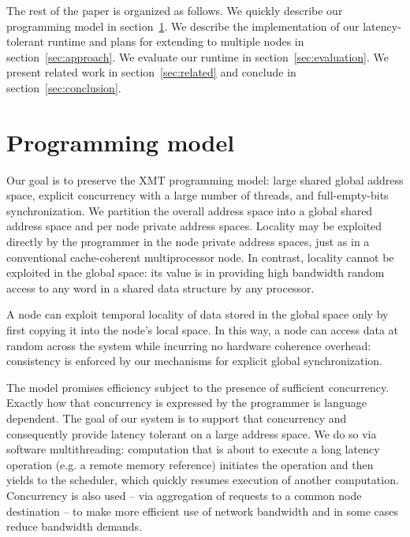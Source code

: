 \documentclass[10pt,nocopyrightspace,preprint]{sigplanconf}
\begin{document}
{The rest of the paper is organized as follows. We quickly describe our
programming model in section~\ref{sec:model}. We describe the
implementation of our latency-tolerant runtime and plans for extending
to multiple nodes in section~\ref{sec:approach}. We evaluate our
runtime in section~\ref{sec:evaluation}.  We present related work in
section~\ref{sec:related} and conclude in
section~\ref{sec:conclusion}.

\section{Programming model}
\label{sec:model}

Our goal is to preserve the XMT programming model: large shared global
address space, explicit concurrency with a large number of threads,
and full-empty-bits synchronization.  We partition the overall address
space into a global shared address space and per node private address
spaces. Locality may be exploited directly by the programmer in the
node private address spaces, just as in a conventional cache-coherent
multiprocessor node. In contrast, locality cannot be exploited in the
global space: its value is in providing high bandwidth random access
to any word in a shared data structure by any processor.


A node can exploit temporal locality of data stored in the global
space only by first copying it into the node's local space.  In this
way, a node can access data at random across the system while
incurring no hardware coherence overhead: consistency is enforced by
our mechanisms for explicit global synchronization.

The model promises efficiency subject to the presence of sufficient
concurrency.  Exactly how that concurrency is expressed by the
programmer is language dependent. The goal of our system is to support
that concurrency and consequently provide latency tolerant on a large
address space. We do so via software multithreading: computation that
is about to execute a long latency operation (e.g. a remote memory
reference) initiates the operation and then yields to the scheduler,
which quickly resumes execution of another computation.  Concurrency
is also used -- via aggregation of requests to a common node
destination -- to make more efficient use of network bandwidth and in
some cases reduce bandwidth demands.

}
\end{document}
